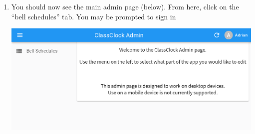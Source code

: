 \documentclass{article}
\begin{document}
\begin{enumerate}
\item {You should now see the main admin page (below). From here, click on the “bell schedules” tab. You may be prompted to
sign in}
\begin{center}
\includegraphics[width=\textwidth]{images/adminpage.png}
\end{center}
\end{enumerate}
\end{document}
